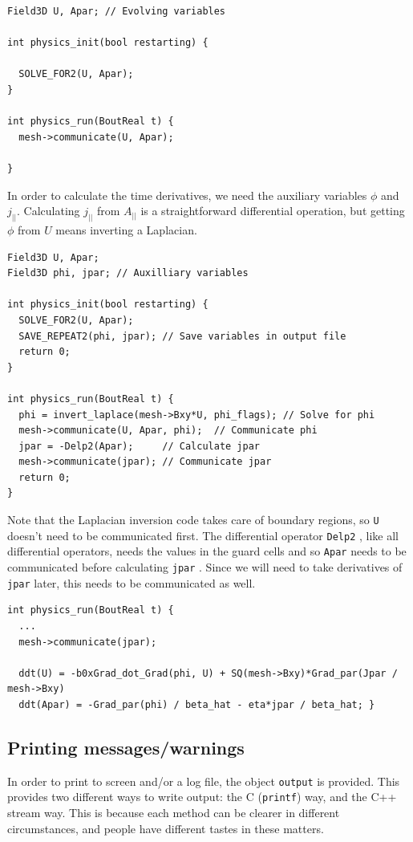 \documentclass[12pt]{article}
\newcommand{\code}[1]{\texttt{#1}}
\begin{document}
%
\begin{lstlisting}
Field3D U, Apar; // Evolving variables

int physics_init(bool restarting) {

  SOLVE_FOR2(U, Apar);
}

int physics_run(BoutReal t) {
  mesh->communicate(U, Apar);

}
\end{lstlisting}
%
In order to calculate the time derivatives, we need the auxiliary variables
$\phi$ and $j_{||}$. Calculating $j_{||}$ from $A_{||}$ is a straightforward
differential operation, but getting $\phi$ from $U$ means inverting a
Laplacian.
%
\begin{lstlisting}
Field3D U, Apar;
Field3D phi, jpar; // Auxilliary variables

int physics_init(bool restarting) {
  SOLVE_FOR2(U, Apar);
  SAVE_REPEAT2(phi, jpar); // Save variables in output file
  return 0;
}

int physics_run(BoutReal t) {
  phi = invert_laplace(mesh->Bxy*U, phi_flags); // Solve for phi
  mesh->communicate(U, Apar, phi);  // Communicate phi
  jpar = -Delp2(Apar);     // Calculate jpar
  mesh->communicate(jpar); // Communicate jpar
  return 0;
}
\end{lstlisting}
%
Note that the Laplacian inversion code takes care of boundary regions, so
%
\lstinline!U!
%
 doesn't need to be communicated first. The differential operator
%
\lstinline!Delp2!
%
, like all differential operators, needs the values in the guard cells and so
%
\lstinline!Apar!
%
 needs to be communicated before calculating
%
\lstinline!jpar!
%
. Since we will need to take derivatives of
%
\lstinline!jpar!
%
 later, this needs to be communicated as well.
%
\begin{lstlisting}
int physics_run(BoutReal t) {
  ...
  mesh->communicate(jpar);

  ddt(U) = -b0xGrad_dot_Grad(phi, U) + SQ(mesh->Bxy)*Grad_par(Jpar / mesh->Bxy)
  ddt(Apar) = -Grad_par(phi) / beta_hat - eta*jpar / beta_hat; }
\end{lstlisting}
%



\subsection{Printing messages/warnings}
%
\label{sec:printing}
%
In order to print to screen and/or a log file, the object \code{output} is
provided.  This provides two different ways to write output: the C
(\code{printf}) way, and the C++ stream way. This is because each method can be
clearer in different circumstances, and people have different tastes in these
matters.
\end{document}
